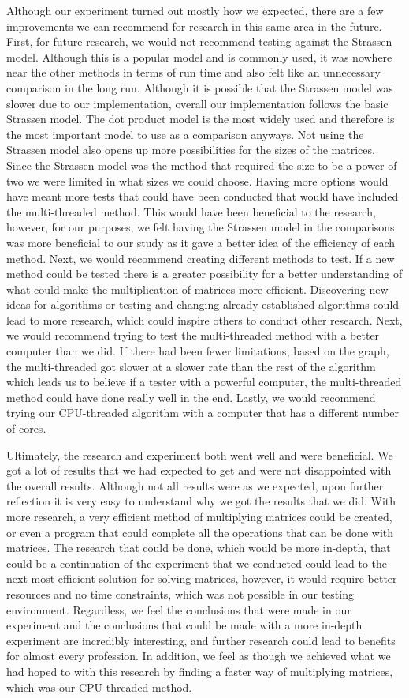 \documentclass[conference]{IEEEtran}
\begin{document}
    Although our experiment turned out mostly how we expected, there are a few improvements we can recommend for research in this same area in the future. First, for future research, we would not recommend testing against the Strassen model. Although this is a popular model and is commonly used, it was nowhere near the other methods in terms of run time and also felt like an unnecessary comparison in the long run. Although it is possible that the Strassen model was slower due to our implementation, overall our implementation follows the basic Strassen model. The dot product model is the most widely used and therefore is the most important model to use as a comparison anyways. Not using the Strassen model also opens up more possibilities for the sizes of the matrices. Since the Strassen model was the method that required the size to be a power of two we were limited in what sizes we could choose. Having more options would have meant more tests that could have been conducted that would have included the multi-threaded method. This would have been beneficial to the research, however, for our purposes, we felt having the Strassen model in the comparisons was more beneficial to our study as it gave a better idea of the efficiency of each method. Next, we would recommend creating different methods to test. If a new method could be tested there is a greater possibility for a better understanding of what could make the multiplication of matrices more efficient. Discovering new ideas for algorithms or testing and changing already established algorithms could lead to more research, which could inspire others to conduct other research. Next, we would recommend trying to test the multi-threaded method with a better computer than we did. If there had been fewer limitations, based on the graph, the multi-threaded got slower at a slower rate than the rest of the algorithm which leads us to believe if a tester with a powerful computer, the multi-threaded method could have done really well in the end.  Lastly, we would recommend trying our CPU-threaded algorithm with a computer that has a different number of cores.

    Ultimately, the research and experiment both went well and were beneficial. We got a lot of results that we had expected to get and were not disappointed with the overall results. Although not all results were as we expected, upon further reflection it is very easy to understand why we got the results that we did. With more research, a very efficient method of multiplying matrices could be created, or even a program that could complete  all the operations that can be done with matrices. The research that could be done, which would be more in-depth, that could be a continuation of the experiment that we conducted could lead to the next most efficient solution for solving matrices, however, it would require better resources and no time constraints, which was not possible in our testing environment. Regardless, we feel the conclusions that were made in our experiment and the conclusions that could be made with a more in-depth experiment are incredibly interesting, and further research could lead to benefits for almost every profession. In addition, we feel as though we achieved what we had hoped to with this research by finding a faster way of multiplying matrices, which was our CPU-threaded method.
\end{document}
